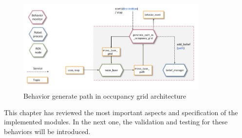  \pagebreak

  \begin{figure}[h]
    \centering
    \includegraphics[width=0.85\textwidth]{./Figures/BehaviorGPArquitecture.png}
    \caption{Behavior generate path in occupancy grid architecture}
    \label{ch_4:fig:behav_gp}
  \end{figure}


This chapter has reviewed the most important aspects and specification of the implemented modules. In the next one, the validation and testing for these behaviors will be introduced.

